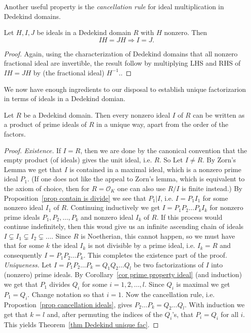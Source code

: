 \documentclass{amsart}
\begin{document}
Another useful property is the \emph{cancellation rule} for ideal multiplication in Dedekind domains.

\begin{proposition}\label{prop cancellation ideals}
Let $H,I,J$ be ideals in a Dedekind domain $R$ with $H$ nonzero. Then
\[ IH=JH \Rightarrow I=J.\]
\end{proposition}

\begin{proof}
Again, using the characterization of Dedekind domains that all nonzero fractional ideal are invertible, the result follow by multiplying LHS and RHS of $IH=JH$ by (the fractional ideal) $H^{-1}$.. 
\end{proof}


We now have enough ingredients to our disposal to establish unique factorizarion in terms of ideals in a Dedekind domian.
\begin{theorem}\label{thm Dedekind unique fac}
Let $R$ be a Dedekind domain. Then every nonzero ideal $I$ of $R$ can be written as a product of prime ideals of $R$ in a unique way, apart from the order of the factors.
\end{theorem}

\begin{proof}
\emph{Existence.} If $I=R$, then we are done by the canonical convention that the empty product (of ideals) gives the unit ideal, i.e. $R$. So Let $I \not=R$. By Zorn's Lemma we get that $I$ is contained in a maximal ideal, which is a nonzero prime ideal $P_1$.
(If one does not like the appeal to Zorn's lemma, which is equivalent to the axiom of choice, then for $R=\mathcal{O}_K$ one can also use $R/I$ is finite instead.)
By Proposition~\ref{prop contain is divide} we see that $P_1|I$, i.e. $I=P_1 I_1$ for some nonzero ideal $I_1$ of $R$. Continuing inductively we get $I=P_1P_2\ldots P_k I_k$ for nonzero prime ideals $P_1,P_2,\ldots, P_k$ and nonzero ideal $I_k$ of $R$. If this process would continue indefinitely, then this woud give us an infinite ascending chain of ideals $I\subsetneq I_1 \subsetneq I_2 \subsetneq \ldots$. Since $R$ is Noetherian, this cannot happen, so we must have that for some $k$ the ideal $I_k$ is not divisible by a prime ideal, i.e. $I_k=R$ and consequently $I=P_1P_2\ldots P_k$. This completes the existence part of the proof.\\
\emph{Uniqueness.} Let $I=P_1P_2\ldots P_k=Q_1Q_2\ldots Q_l$ be two factorizations of $I$ into (nonzero) prime ideals. By Corollary~\ref{cor prime property ideal} (and induction) we get that $P_1$ divides $Q_i$ for some $i=1,2,\ldots,l$. Since $Q_i$ is maximal we get $P_1=Q_i$. Change notation so that $i=1$. Now the cancellation rule, i.e. Propostion~\ref{prop cancellation ideals}, gives $P_2 \ldots P_k=Q_2 \ldots Q_l$. With induction we get that $k=l$ and, after permuting the indices of the $Q_i$'s, that $P_i=Q_i$ for all $i$. This yields Theorem~\ref{thm Dedekind unique fac}.
\end{proof}
\end{document}
